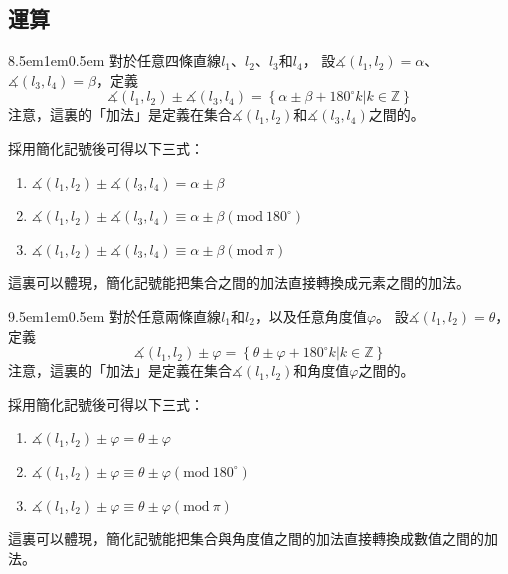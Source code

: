 \documentclass[12pt]{article}
\begin{document}
\subsection{運算}
\begin{mybox}[集合-集合加法]{8.5em}{1em}{0.5em}
    對於任意四條直線$l_1$、$l_2$、$l_3$和$l_4$，
    設$\measuredangle{\left(l_1,l_2\right)}=\alpha$、$\measuredangle{\left(l_3,l_4\right)}=\beta$，定義
    $$
        \measuredangle{\left(l_1,l_2\right)}\pm\measuredangle{\left(l_3,l_4\right)}=\left\{\alpha\pm\beta+180^{\circ}k\left|k\in\mathbb{Z}\right.\right\}
    $$
    注意，這裏的「加法」是定義在集合$\measuredangle{\left(l_1,l_2\right)}$和$\measuredangle{\left(l_3,l_4\right)}$之間的。
    
    採用簡化記號後可得以下三式：
    \begin{enumerate}
        \item $\measuredangle{\left(l_1,l_2\right)}\pm\measuredangle{\left(l_3,l_4\right)}=\alpha\pm\beta$
        \item $\measuredangle{\left(l_1,l_2\right)}\pm\measuredangle{\left(l_3,l_4\right)}\equiv\alpha\pm\beta\left(\text{mod}\ {180^{\circ}}\right)$
        \item $\measuredangle{\left(l_1,l_2\right)}\pm\measuredangle{\left(l_3,l_4\right)}\equiv\alpha\pm\beta\left(\text{mod}\ {\pi}\right)$
    \end{enumerate}
    這裏可以體現，簡化記號能把集合之間的加法直接轉換成元素之間的加法。
\end{mybox}
\begin{mybox}[集合-角度值加法]{9.5em}{1em}{0.5em}
    對於任意兩條直線$l_1$和$l_2$，以及任意角度值$\varphi$。
    設$\measuredangle{\left(l_1,l_2\right)}=\theta$，定義
    $$
        \measuredangle{\left(l_1,l_2\right)}\pm\varphi=\left\{\theta\pm\varphi+180^{\circ}k\left|k\in\mathbb{Z}\right.\right\}
    $$
    注意，這裏的「加法」是定義在集合$\measuredangle{\left(l_1,l_2\right)}$和角度值$\varphi$之間的。
    
    採用簡化記號後可得以下三式：
    \begin{enumerate}
        \item $\measuredangle{\left(l_1,l_2\right)}\pm\varphi=\theta\pm\varphi$
        \item $\measuredangle{\left(l_1,l_2\right)}\pm\varphi\equiv\theta\pm\varphi\left(\text{mod}\ {180^{\circ}}\right)$
        \item $\measuredangle{\left(l_1,l_2\right)}\pm\varphi\equiv\theta\pm\varphi\left(\text{mod}\ {\pi}\right)$
    \end{enumerate}
    這裏可以體現，簡化記號能把集合與角度值之間的加法直接轉換成數值之間的加法。
\end{mybox}
\end{document}
